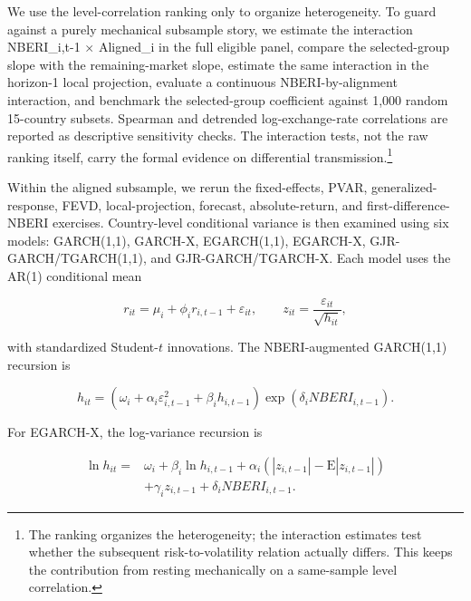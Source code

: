 \documentclass[11pt]{article}
\begin{document}
We use the level-correlation ranking only to organize heterogeneity. To
guard against a purely mechanical subsample story, we estimate the
interaction NBERI\_i,t-1 $\times$ Aligned\_i in the full eligible panel,
compare the selected-group slope with the remaining-market slope,
estimate the same interaction in the horizon-1 local projection,
evaluate a continuous NBERI-by-alignment interaction, and benchmark
the selected-group coefficient against 1,000 random 15-country subsets.
Spearman and detrended log-exchange-rate correlations are reported as
descriptive sensitivity checks. The interaction tests, not the
raw ranking itself, carry the formal evidence on differential
transmission.\footnote{The ranking organizes the heterogeneity; the interaction estimates test whether the subsequent risk-to-volatility relation actually differs. This keeps the contribution from resting mechanically on a same-sample level correlation.}

Within the aligned subsample, we rerun the fixed-effects, PVAR, generalized-response, FEVD, local-projection, forecast, absolute-return, and first-difference-NBERI exercises. Country-level conditional variance is then examined using six models: GARCH(1,1), GARCH-X, EGARCH(1,1), EGARCH-X, GJR-GARCH/TGARCH(1,1), and GJR-GARCH/TGARCH-X. Each model uses the AR(1) conditional mean

\begin{equation}
\label{eq:garch-mean}
r_{it}=\mu_i+\phi_i r_{i,t-1}+\varepsilon_{it},
\qquad
z_{it}=\frac{\varepsilon_{it}}{\sqrt{h_{it}}},
\end{equation}

with standardized Student-$t$ innovations. The NBERI-augmented GARCH(1,1) recursion is

\begin{equation}
\label{eq:garchx-country}
h_{it}
=\left(\omega_i+\alpha_i\varepsilon_{i,t-1}^{2}+\beta_i h_{i,t-1}\right)
\exp\!\left(\delta_i NBERI_{i,t-1}\right).
\end{equation}

For EGARCH-X, the log-variance recursion is

\begin{equation}
\label{eq:egarchx-country}
\begin{aligned}
\ln h_{it}
={}&\omega_i+\beta_i\ln h_{i,t-1}
+\alpha_i\!\left(|z_{i,t-1}|-\mathrm{E}|z_{i,t-1}|\right)\\
&+\gamma_i z_{i,t-1}+\delta_i NBERI_{i,t-1}.
\end{aligned}
\end{equation}
\end{document}
